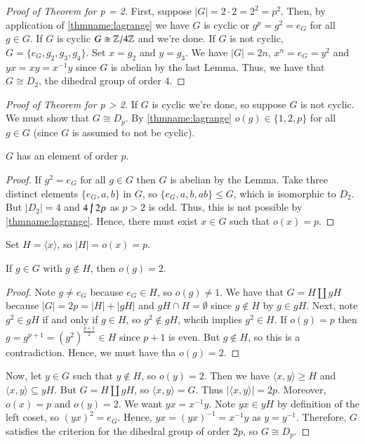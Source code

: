 \documentclass[12pt, a4paper, oneside, openright, titlepage]{book}
\begin{document}
\begin{proof}[Proof of Theorem for p = 2]
        First, suppose $|G| = 2\cdot 2 = 2^2 = p^2$. Then, by application of \ref{thmname:lagrange} we have $G$ is cyclic or $g^p = g^2 = e_G$ for all $g \in G$. If $G$ is cyclic $G \cong \mathbb Z/4\mathbb Z$ and we're done. If $G$ is not cyclic, $G = \{e_G,g_2,g_3,g_4\}$. Set $x = g_2$ and $y = g_3$. We have $|G| = 2n$, $x^n = e_G = y^2$ and $yx= xy = x^{-1}y$ since $G$ is abelian by the last Lemma. Thus, we have that $G \cong D_2$, the dihedral group of order $4$.
\end{proof}

\begin{proof}[Proof of Theorem for p > 2]
        If $G$ is cyclic we're done, so suppose $G$ is not cyclic. We must show that $G \cong D_p$. By \ref{thmname:lagrange} $o(g) \in \{1,2,p\}$ for all $g \in G$ (since $G$ is assumed to not be cyclic). 

        \begin{claim}
                $G$ has an element of order $p$.
        \end{claim}
        \begin{proof}
                If $g^2 = e_G$ for all $g \in G$ then $G$ is abelian by the Lemma. Take three distinct elements $\{e_G, a, b\}$ in $G$, so $\{e_G,a,b,ab\} \leq G$, which is isomorphic to $D_2$. But $|D_2| = 4$ and $4 \;\cancel{\vert}\;2p$ as $p > 2$ is odd. Thus, this is not possible by \ref{thmname:lagrange}. Hence, there must exist $x \in G$ such that $o(x) = p$.
        \end{proof}
        Set $H = \langle x \rangle$, so $|H| = o(x) = p$.
        
        \begin{claim}
                If $g \in G$ with $g \notin H$, then $o(g) = 2$.
        \end{claim}
        \begin{proof}
                Note $g \neq e_G$ because $e_G \in H$, so $o(g) \neq 1$. We have that $G = H\coprod gH$ because $|G| = 2p = |H| + |gH|$ and $gH \cap H =\emptyset$ since $g \notin H$ by $g \in gH$. Next, note $g^2 \in gH$ if and only if $g \in H$, so $g^2 \notin gH$, whcih implies $g^2 \in H$. If $o(g) = p$ then $g = g^{p+1} = (g^2)^{\frac{p+1}{2}} \in H$ since $p+1$ is even. But $g \notin H$, so this is a contradiction. Hence, we must have tha $o(g) = 2$.
        \end{proof}

        Now, let $y \in G$ such that $y \notin H$, so $o(y) = 2$. Then we have $\langle x,y\rangle \geq H$ and $\langle x, y \rangle \subseteq yH$. But $G = H\coprod gH$, so $\langle x,y \rangle = G$. Thus $|\langle x,y \rangle| = 2p$. Moreover, $o(x) = p$ and $o(y) = 2$. We want $yx = x^{-1}y$. Note $yx \in yH$ by definition of the left coset, so $(yx)^2 = e_G$. Hence, $yx = (yx)^{-1} = x^{-1}y$ as $y = y^{-1}$. Therefore, $G$ satisfies the criterion for the dihedral group of order $2p$, so $G \cong D_p$.
\end{proof}
\end{document}
